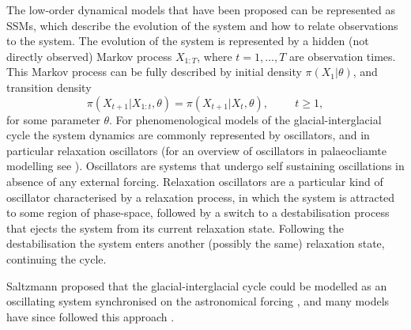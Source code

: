 \documentclass[a4paper,12pt]{article}
\begin{document}
The low-order dynamical models that have been proposed can be represented as SSMs, which describe the evolution of the system and how to relate observations to the system.
The evolution of the system is represented by a hidden (not directly observed) Markov process $X_{1:T}$, where $t=1,...,T$ are observation times.
This Markov process can be fully described by initial density $\pi (X_1 \vert \theta)$, and transition density
\begin{equation}
\pi (X_{t+1} \vert X_{1:t}, \theta) = \pi (X_{t+1} \vert X_t, \theta), \hspace{1cm} t \geq 1 ,
\end{equation}
\noindent for some parameter $\theta$.
For phenomenological models of the glacial-interglacial cycle the system dynamics are commonly represented by oscillators, and in particular relaxation oscillators (for an overview of oscillators in palaeocliamte modelling see \cite{Crucifix2012}).
Oscillators are systems that undergo self sustaining oscillations in absence of any external forcing.
Relaxation oscillators are a particular kind of oscillator characterised by a relaxation process, in which the system is attracted to some region of phase-space, followed by a switch to a destabilisation process that ejects the system from its current relaxation state.
Following the destabilisation the system enters another (possibly the same) relaxation state, continuing the cycle.


Saltzmann proposed that the glacial-interglacial cycle could be modelled as an oscillating system synchronised on the astronomical forcing \cite{Saltzman1990,Saltzman1991}, and many models have since followed this approach \cite{Crucifix2012,Crucifix2013}.
\end{document}
